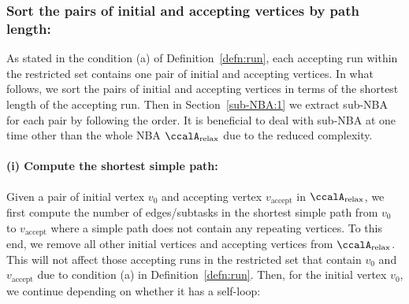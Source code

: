 \documentclass[Afour,sageh,times]{sagej}
\newcommand{\auto}[1]{\ccalA_{\text{#1}}}
\begin{document}
{%

  \subsubsection{Sort the pairs of initial and accepting vertices by path length:}\label{sec:sort}  As stated in the condition (a) of Definition~\ref{defn:run}, each accepting run within the restricted set  contains  one pair of initial and accepting vertices. In what follows, we sort the pairs of initial and accepting vertices in terms of the shortest length of the accepting run.  Then in Section~\ref{sub-NBA:1} we extract sub-NBA for each pair by following the order. It is beneficial to deal with sub-NBA at one time other than the whole NBA $\auto{relax}$ due to the reduced complexity.
 \paragraph{(i) Compute the shortest simple path:} Given a pair of initial vertex $v_0$ and accepting vertex $v_{\text{accept}}$ in $\auto{relax}$, we first compute the number of edges/subtasks in the shortest simple path from  $v_0$ to $v_{\text{accept}}$ where a simple path does not contain any  repeating vertices. To this end, we remove all other initial vertices and accepting vertices from $\auto{relax}$. This will not affect those accepting runs in the restricted set that contain $v_0$ and $v_{\text{accept}}$ due to condition (a) in Definition~\ref{defn:run}.  Then, for the initial vertex $v_0$, we continue depending on whether it has a self-loop:
}
\end{document}
